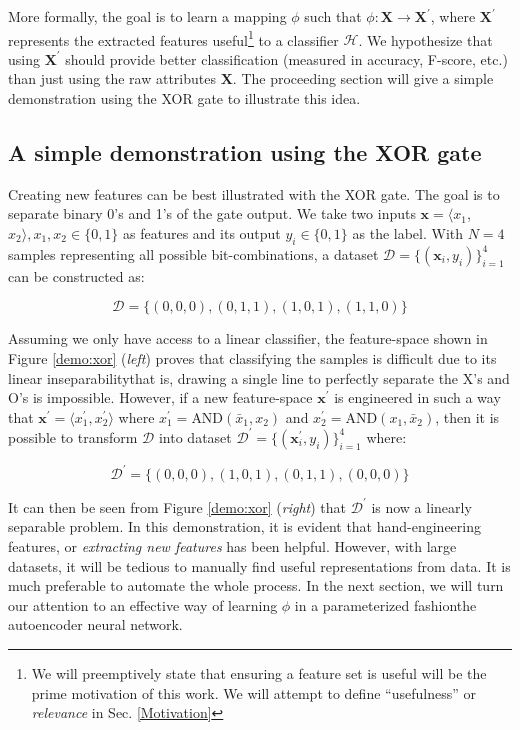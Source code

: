 \par More formally, the goal is to learn a mapping $\phi$ such that $\phi:
\mathbf{X} \rightarrow \mathbf{X}^{\prime}$, where $\mathbf{X}^{\prime}$
represents the extracted features useful\footnote{
  We will preemptively state that ensuring a feature set is useful will
  be the prime motivation of this work. We will attempt to define ``usefulness''
  or \textit{relevance} in Sec. \ref{Motivation}
} to a classifier $\mathcal{H}$. We
hypothesize that using $\mathbf{X}^{\prime}$ should provide better
classification (measured in accuracy, F-score, etc.) than just using the raw
attributes $\mathbf{X}$. The proceeding section will give a simple
demonstration using the XOR gate to illustrate this idea.

\subsection{A simple demonstration using the XOR gate}

\par Creating new features can be best illustrated with the XOR gate. The
goal is to separate binary 0's and 1's of the gate output. We take two
inputs $\mathbf{x} = \langle x_{1}$, $x_{2} \rangle, x_1, x_2 \in \{0,1\}$ as
features and its output $y_{i} \in \{0,1\}$ as the label. With $N=4$ samples
representing all possible bit-combinations, a dataset
$\mathcal{D}=\{(\mathbf{x}_{i}, y_{i})\}_{i=1}^{4}$ can be constructed as:

\[
    \mathcal{D} = \{(0,0,0), (0,1,1), (1,0,1), (1,1,0)\}
\]

Assuming we only have access to a linear classifier, the feature-space shown
in Figure \ref{demo:xor} (\textit{left}) proves that classifying the samples
is difficult due to its linear inseparability\textemdash that is, drawing a
single line to perfectly separate the X's and O's is impossible.
However, if a new feature-space $\mathbf{x}^{\prime}$ is engineered in such a
way that $\mathbf{x}^{\prime} = \langle {x}^{\prime}_{1}, {x}^{\prime}_2 \rangle$ where 
$x^{\prime}_{1} = \text{AND}(\bar{x}_{1}, x_{2})$ and $x^{\prime}_{2}
= \text{AND}(x_{1}, \bar{x}_{2})$, then it is possible to transform $\mathcal{D}$
into dataset $\mathcal{D}^{\prime}=\{(\mathbf{x}^{\prime}_{i}, y_{i})\}_{i=1}^{4}$
where:

\[
    \mathcal{D}^{\prime} = \{(0,0,0), (1,0,1), (0,1,1), (0,0,0)\}
\]

\par It can then be seen from Figure \ref{demo:xor} (\textit{right}) that
$\mathcal{D}^{\prime}$ is now a linearly separable problem. In this
demonstration, it is evident that hand-engineering features, or
\textit{extracting new features} has been helpful. However, with large
datasets, it will be tedious to manually find useful representations from
data. It is much preferable to automate the whole process. In the next
section, we will turn our attention to an effective way of learning $\phi$ in
a parameterized fashion\textemdash the autoencoder neural network.

